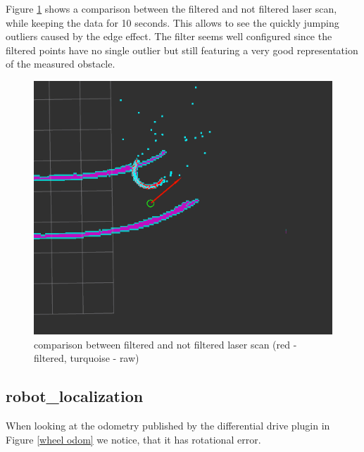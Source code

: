 Figure \ref{lasercomp} shows a comparison between the filtered and not filtered laser scan, while keeping the data for 10 seconds. This allows to see the quickly jumping outliers caused by the edge effect. The filter seems well configured since the filtered points have no single outlier but still featuring a very good representation of the measured obstacle.

\begin{figure}[H]
	\includegraphics[width=\textwidth]{Pictures/LASERFILTER COMP}	
	\caption{comparison between filtered and not filtered laser scan (red - filtered, turquoise - raw)}
	\label{lasercomp}
\end{figure}


\subsection{robot\_localization}

When looking at the odometry published by the differential drive plugin in Figure \ref{wheel odom} we notice, that it has rotational error.\\


